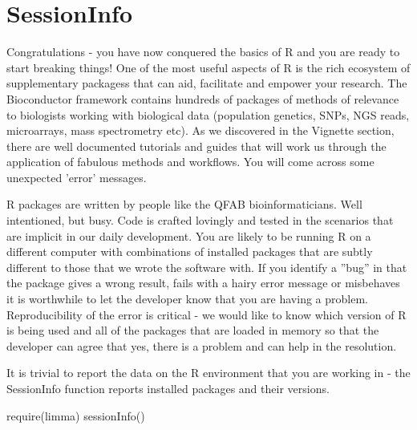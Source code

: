 \documentclass[a4paper]{book}
\newenvironment{Shaded}{}{}
\newcommand{\KeywordTok}[1]{\textcolor[rgb]{0.00,0.00,1.00}{{#1}}}
\newcommand{\NormalTok}[1]{{#1}}
\newlength{\leftbarwidth}
\newlength{\leftbarsep}
\newcommand*{\leftbarcolorcmd}{\color{darkgray}}%
\renewenvironment{leftbar}{%
    \def\FrameCommand{{\leftbarcolorcmd{\vrule width \leftbarwidth\relax\hspace {\leftbarsep}}}}%
    \MakeFramed {\advance \hsize -\width \FrameRestore }%
}{%
    \endMakeFramed
}
\renewenvironment{Shaded}
{\vspace{0em}\begin{leftbar}\begin{snugshade}}
{\end{snugshade}\end{leftbar}\vspace{0pt}}
\begin{document}
\section{SessionInfo}\label{sessioninfo}

Congratulations - you have now conquered the basics of R and you are
ready to start breaking things! One of the most useful aspects of R is
the rich ecosystem of supplementary packagess that can aid, facilitate
and empower your research. The Bioconductor framework contains hundreds
of packages of methods of relevance to biologists working with
biological data (population genetics, SNPs, NGS reads, microarrays, mass
spectrometry etc). As we discovered in the Vignette section, there are
well documented tutorials and guides that will work us through the
application of fabulous methods and workflows. You will come across some
unexpected 'error' messages.

R packages are written by people like the QFAB bioinformaticians. Well
intentioned, but busy. Code is crafted lovingly and tested in the
scenarios that are implicit in our daily development. You are likely to
be running R on a different computer with combinations of installed
packages that are subtly different to those that we wrote the software
with. If you identify a ''bug'' in that the package gives a wrong
result, fails with a hairy error message or misbehaves it is worthwhile
to let the developer know that you are having a problem. Reproducibility
of the error is critical - we would like to know which version of R is
being used and all of the packages that are loaded in memory so that the
developer can agree that yes, there is a problem and can help in the
resolution.

It is trivial to report the data on the R environment that you are
working in - the SessionInfo function reports installed packages and
their versions.

\begin{Shaded}
\begin{Highlighting}[]
\KeywordTok{require}\NormalTok{(limma)}
\KeywordTok{sessionInfo}\NormalTok{()}
\end{Highlighting}
\end{Shaded}
\end{document}
